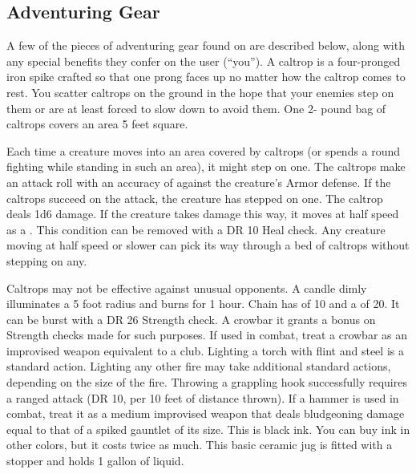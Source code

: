     \subsection{Adventuring Gear}
        A few of the pieces of adventuring gear found on  are described below, along with any special benefits they confer on the user (``you'').
         A caltrop is a four-pronged iron spike crafted so that one prong faces up no matter how the caltrop comes to rest. You scatter caltrops on the ground in the hope that your enemies step on them or are at least forced to slow down to avoid them. One 2- pound bag of caltrops covers an area 5 feet square.
        \par Each time a creature moves into an area covered by caltrops (or spends a round fighting while standing in such an area), it might step on one. The caltrops make an attack roll with an accuracy of  against the creature's Armor defense. If the caltrops succeed on the attack, the creature has stepped on one. The caltrop deals 1d6 damage. If the creature takes damage this way, it moves at half speed as a . This condition can be removed with a DR 10 Heal check. Any creature moving at half speed or slower can pick its way through a bed of caltrops without stepping on any.
        \par Caltrops may not be effective against unusual opponents.
         A candle dimly illuminates a 5 foot radius and burns for 1 hour.
         Chain has  of 10 and a  of 20. It can be burst with a DR 26 Strength check.
         A crowbar it grants a  bonus on Strength checks made for such purposes. If used in combat, treat a crowbar as an improvised weapon equivalent to a club.
         Lighting a torch with flint and steel is a standard action.
        Lighting any other fire may take additional standard actions, depending on the size of the fire.
         Throwing a grappling hook successfully requires a ranged attack (DR 10,  per 10 feet of distance thrown).
         If a hammer is used in combat, treat it as a medium improvised weapon that deals bludgeoning damage equal to that of a spiked gauntlet of its size.
         This is black ink. You can buy ink in other colors, but it costs twice as much.
         This basic ceramic jug is fitted with a stopper and holds 1 gallon of liquid.
